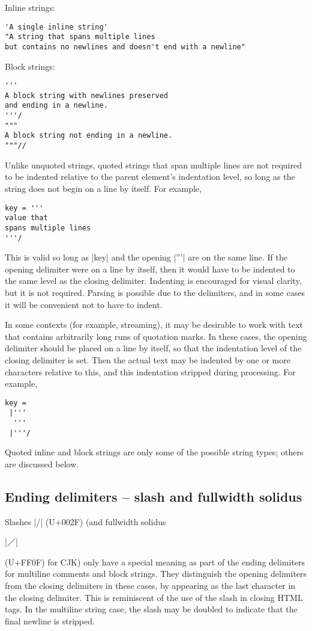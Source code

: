 \documentclass[11pt]{article}
\begin{document}
Inline strings:
\begin{Verbatim}
'A single inline string'
"A string that spans multiple lines
but contains no newlines and doesn't end with a newline"
\end{Verbatim}

Block strings:
\begin{Verbatim}
'''
A block string with newlines preserved
and ending in a newline.
'''/
"""
A block string not ending in a newline.
"""//
\end{Verbatim}

Unlike unquoted strings, quoted strings that span multiple lines are not required to be indented relative to the parent element's indentation level, so long as the string does not begin on a line by itself.  For example,
\begin{Verbatim}
key = '''
value that
spans multiple lines
'''/
\end{Verbatim}
This is valid so long as |key| and the opening |'''| are on the same line.  If the opening delimiter were on a line by itself, then it would have to be indented to the same level as the closing delimiter.  Indenting is encouraged for visual clarity, but it is not required.  Parsing is possible due to the delimiters, and in some cases it will be convenient not to have to indent.

In some contexts (for example, streaming), it may be desirable to work with text that contains arbitrarily long runs of quotation marks.  In these cases, the opening delimiter should be placed on a line by itself, so that the indentation level of the closing delimiter is set.  Then the actual text may be indented by one or more characters relative to this, and this indentation stripped during processing.  For example,
\begin{Verbatim}
key =
 |'''
  '''
 |'''/
\end{Verbatim}


Quoted inline and block strings are only some of the possible string types; others are discussed below.


\subsection{Ending delimiters -- slash and fullwidth solidus}

Slashes |/| (U+002F) (and fullwidth solidus \begin{CJK*}{UTF8}{gkai}|／|\end{CJK*} (U+FF0F) for CJK) only have a special meaning as part of the ending delimiters for multiline comments and block strings.  They distinguish the opening delimiters from the closing delimiters in these cases, by appearing as the last character in the closing delimiter.  This is reminiscent of the use of the slash in closing HTML tags.  In the multiline string case, the slash may be doubled to indicate that the final newline is stripped.
\end{document}
